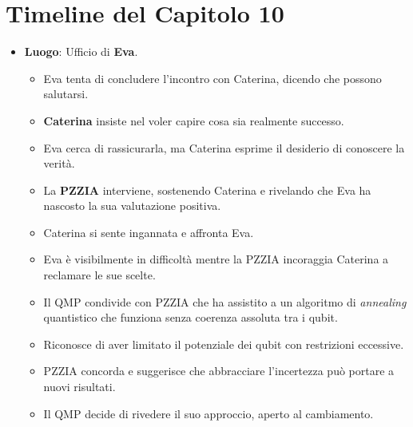 \section*{Timeline del Capitolo 10}

\begin{itemize}
\begin{itemize}
    \item  Dopo l'elaborazione nel \emph{Quantum Annealing}, una grande calma regna nel sistema.
    \item \textbf{Laura} si ritrova a casa, sdraiata sul pavimento con il suo cane \textbf{Hiroki} accanto.
    \item Sente sollievo ma si chiede cosa sia successo a \textbf{Caterina}.
    \item Riflette sulle sue esperienze e sul bisogno di fare scelte significative nella sua vita.
\end{itemize}

\item \textbf{Luogo}: Ufficio di \textbf{Eva}.
\begin{itemize}
    
    \item Eva tenta di concludere l'incontro con Caterina, dicendo che possono salutarsi.
    \item \textbf{Caterina} insiste nel voler capire cosa sia realmente successo.
    \item Eva cerca di rassicurarla, ma Caterina esprime il desiderio di conoscere la verità.
    \item La \textbf{PZZIA} interviene, sostenendo Caterina e rivelando che Eva ha nascosto la sua valutazione positiva.
    \item Caterina si sente ingannata e affronta Eva.
    \item Eva è visibilmente in difficoltà mentre la PZZIA incoraggia Caterina a reclamare le sue scelte.
\end{itemize}


\begin{itemize}
    \item Il QMP condivide con PZZIA che ha assistito a un algoritmo di \emph{annealing} quantistico che funziona senza coerenza assoluta tra i qubit.
    \item Riconosce di aver limitato il potenziale dei qubit con restrizioni eccessive.
    \item PZZIA concorda e suggerisce che abbracciare l'incertezza può portare a nuovi risultati.
    \item Il QMP decide di rivedere il suo approccio, aperto al cambiamento.
\end{itemize}


\end{itemize}
